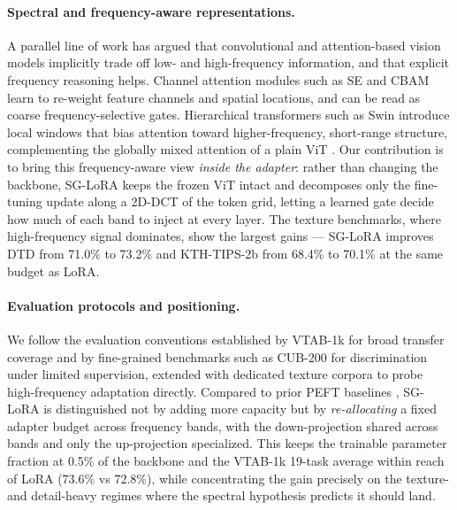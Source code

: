 \documentclass{article}
\begin{document}
\paragraph{Spectral and frequency-aware representations.}
A parallel line of work has argued that convolutional and attention-based
vision models implicitly trade off low- and high-frequency information,
and that explicit frequency reasoning helps. Channel attention modules such
as SE \citep{hu2018senet} and CBAM \citep{woo2018cbam} learn to re-weight
feature channels and spatial locations, and can be read as coarse
frequency-selective gates. Hierarchical transformers such as Swin
\citep{liu2021swin} introduce local windows that bias attention toward
higher-frequency, short-range structure, complementing the globally mixed
attention of a plain ViT \citep{vaswani2017attention, dosovitskiy2021vit}.
Our contribution is to bring this frequency-aware view \emph{inside the
adapter}: rather than changing the backbone, SG-LoRA keeps the frozen ViT
intact and decomposes only the fine-tuning update along a 2D-DCT of the
token grid, letting a learned gate decide how much of each band to inject
at every layer. The texture benchmarks, where high-frequency signal
dominates, show the largest gains — SG-LoRA improves DTD \citep{cimpoi2014dtd}
from 71.0\% to 73.2\% and KTH-TIPS-2b from 68.4\% to 70.1\% at the same
budget as LoRA.

\paragraph{Evaluation protocols and positioning.}
We follow the evaluation conventions established by VTAB-1k
\citep{zhai2019vtab} for broad transfer coverage and by fine-grained
benchmarks such as CUB-200 \citep{wah2011cub} for discrimination under
limited supervision, extended with dedicated texture corpora
\citep{cimpoi2014dtd} to probe high-frequency adaptation directly. Compared
to prior PEFT baselines \citep{hu2022lora, liu2024dora, chen2022adaptformer, jia2022vpt}, SG-LoRA is distinguished not by adding more capacity but by
\emph{re-allocating} a fixed adapter budget across frequency bands, with
the down-projection shared across bands and only the up-projection
specialized. This keeps the trainable parameter fraction at 0.5\% of the
backbone and the VTAB-1k 19-task average within reach of LoRA (73.6\% vs
72.8\%), while concentrating the gain precisely on the texture- and
detail-heavy regimes where the spectral hypothesis predicts it should land.
\end{document}
